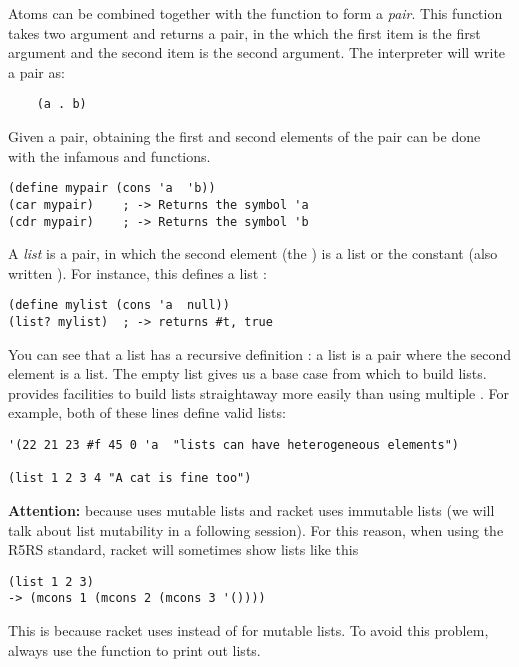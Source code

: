 \documentclass{../../../tp}
\begin{document}
Atoms can be combined together with the  function to form a \emph{pair}. This function takes two argument and returns a pair, in the which the first item is the first argument and the second item is the second argument. The \scheme interpreter will write a pair as:

\begin{verbatim}
	(a . b)
\end{verbatim}

Given a pair, obtaining the first and second elements of the pair can be done with the infamous \car and \cdr functions.

\begin{verbatim}
(define mypair (cons 'a  'b))
(car mypair)	; -> Returns the symbol 'a
(cdr mypair)	; -> Returns the symbol 'b
\end{verbatim}


A \emph{list} is a pair, in which the second element (the \cdr) is a list or the constant  (also written ). For instance, this defines a list :

\begin{verbatim}
(define mylist (cons 'a  null))
(list? mylist) 	; -> returns #t, true
\end{verbatim}

You can see that a list has a recursive definition : a list is a pair where the second element is a list. The empty list  gives us a base case from which to build lists. \scheme provides facilities to build lists straightaway more easily than using multiple . For example, both of these lines define valid lists:

\begin{verbatim}
'(22 21 23 #f 45 0 'a  "lists can have heterogeneous elements")

(list 1 2 3 4 "A cat is fine too")
\end{verbatim}

\textbf{Attention:} because \scheme uses mutable lists and racket uses immutable lists (we will talk about list mutability in a following session). For this reason, when using the R5RS standard, racket will sometimes show lists like this

\begin{verbatim}
(list 1 2 3)
-> (mcons 1 (mcons 2 (mcons 3 '())))
\end{verbatim}

This is because racket uses  instead of  for mutable lists. To avoid this problem, always use the  function to print out lists.
\end{document}
